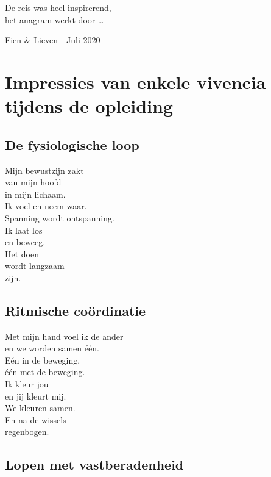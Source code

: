 \documentclass[
  11pt,
]{book}
\begin{document}
De reis was heel inspirerend,\\
het anagram werkt door \ldots{}

Fien \& Lieven - Juli 2020

\section*{Impressies van enkele vivencia tijdens de opleiding}\label{impressies-van-enkele-vivencia-tijdens-de-opleiding}

\subsection*{De fysiologische loop}\label{de-fysiologische-loop}

Mijn bewustzijn zakt\\
van mijn hoofd\\
in mijn lichaam.\\
Ik voel en neem waar.\\
Spanning wordt ontspanning.\\
Ik laat los\\
en beweeg.\\
Het doen\\
wordt langzaam\\
zijn.

\subsection*{Ritmische coördinatie}\label{ritmische-couxf6rdinatie}

Met mijn hand voel ik de ander\\
en we worden samen één.\\
Eén in de beweging,\\
één met de beweging.\\
Ik kleur jou\\
en jij kleurt mij.\\
We kleuren samen.\\
En na de wissels\\
regenbogen.

\subsection*{Lopen met vastberadenheid}\label{lopen-met-vastberadenheid}
\end{document}
